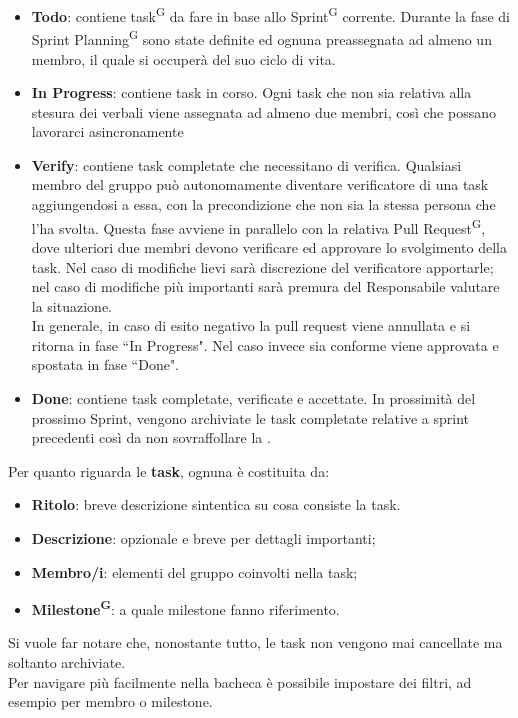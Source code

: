 \documentclass[8pt]{article}
\newcommand{\glossterm}[1]{#1\textsuperscript{G}} %
\begin{document}
\begin{itemize}
    \item \textbf{Todo}: contiene \glossterm{task} da fare in base allo \glossterm{Sprint} corrente. Durante la fase di Sprint \glossterm{Planning} sono state definite ed ognuna preassegnata ad almeno un membro, il quale si occuperà del suo ciclo di vita.
  \item \textbf{In Progress}: contiene task in corso. Ogni task che non sia relativa alla stesura dei verbali viene assegnata ad almeno due membri, così che possano lavorarci asincronamente
  \item \textbf{Verify}: contiene task completate che necessitano di verifica. Qualsiasi membro del
      gruppo può autonomamente diventare verificatore di una task aggiungendosi a essa, con la
        precondizione che non sia la stessa persona che l'ha svolta. Questa fase avviene in
        parallelo con la relativa \glossterm{Pull Request}, dove ulteriori due membri devono verificare ed
        approvare lo svolgimento della task. Nel caso di modifiche lievi sarà discrezione del
        verificatore apportarle; nel caso di modifiche più importanti sarà premura del Responsabile
        valutare la situazione.\\In generale, in caso di esito negativo la pull request viene
        annullata e si ritorna in fase ``In Progress". Nel caso invece sia conforme viene approvata
        e spostata in fase ``Done".
  \item \textbf{Done}: contiene task completate, verificate e accettate. In prossimità del prossimo
      Sprint, vengono archiviate le task completate relative a sprint precedenti così da non sovraffollare la .
\end{itemize}
\medskip
Per quanto riguarda le \textbf{task}, ognuna è costituita da:
\begin{itemize}
  \item \textbf{Ritolo}: breve descrizione sintentica su cosa consiste la task.
  \item \textbf{Descrizione}: opzionale e breve per dettagli importanti;
  \item \textbf{Membro/i}: elementi del gruppo coinvolti nella task;
  \item \textbf{\glossterm{Milestone}}: a quale milestone fanno riferimento.
\end{itemize}
Si vuole far notare che, nonostante tutto, le task non vengono mai cancellate ma soltanto archiviate. \\Per navigare più facilmente nella bacheca è possibile impostare dei filtri, ad esempio per membro o milestone.
\end{document}
